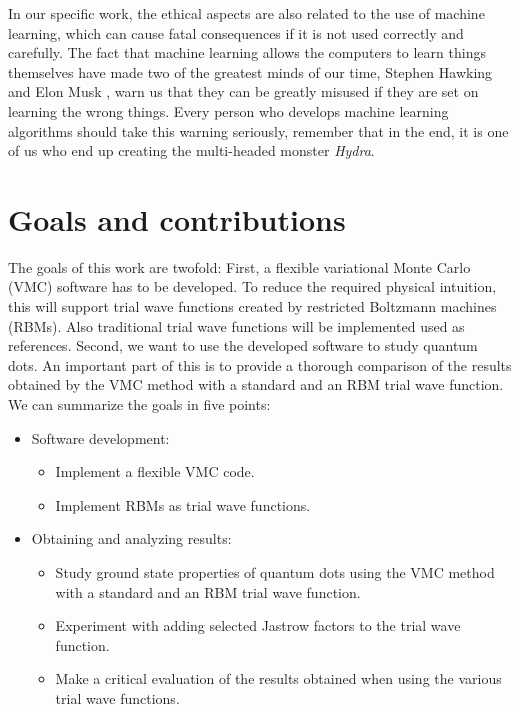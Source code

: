 In our specific work, the ethical aspects are also related to the use of machine learning, which can cause fatal consequences if it is not used correctly and carefully. The fact that machine learning allows the computers to learn things themselves have made two of the greatest minds of our time, Stephen Hawking \supercite{cellan-jones_hawking:_2014} and Elon Musk \supercite{vance_elon_2015}, warn us that they can be greatly misused if they are set on learning the wrong things. Every person who develops machine learning algorithms should take this warning seriously, remember that in the end, it is one of us who end up creating the multi-headed monster \textit{Hydra}.

\section{Goals and contributions} \label{sec:goals}
The goals of this work are twofold: First, a flexible variational Monte Carlo (VMC) software has to be developed. To reduce the required physical intuition, this will support trial wave functions created by restricted Boltzmann machines (RBMs). Also traditional trial wave functions will be implemented used as references. Second, we want to use the developed software to study quantum dots. An important part of this is to provide a thorough comparison of the results obtained by the VMC method with a standard and an RBM trial wave function. We can summarize the goals in five points:
\begin{itemize}
	\item Software development:
	\begin{itemize}
		\item Implement a flexible VMC code.
		\item Implement RBMs as trial wave functions.
	\end{itemize}
	\item Obtaining and analyzing results:
	\begin{itemize}
		\item Study ground state properties of quantum dots using the VMC method with a standard and an RBM trial wave function.
		\item Experiment with adding selected Jastrow factors to the trial wave function.
		\item Make a critical evaluation of the results obtained when using the various trial wave functions.
	\end{itemize}
\end{itemize}

